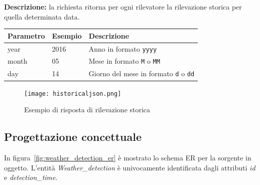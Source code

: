 \noindent\textbf{Descrizione:} la richiesta ritorna per ogni rilevatore la rilevazione storica per quella
determinata data.

\begin{table}[h]
\centering
\begin{tabular}{|l|l|l|}
\hline
\rowcolor[HTML]{3166FF} 
{\color[HTML]{FFFFFF} \textbf{Parametro}} & {\color[HTML]{FFFFFF} \textbf{Esempio}} & {\color[HTML]{FFFFFF} \textbf{Descrizione}}                           \\ \hline
year                                 & 2016                      & Anno in formato \texttt{yyyy} \\ \hline
month                                 & 05                      & Mese in formato \texttt{M} o \texttt{MM}    \\ \hline
day                                 & 14                      & Giorno del mese in formato \texttt{d} o \texttt{dd}    \\ \hline
\end{tabular}%

\end{table}


\begin{figure}[H]
\centering
\texttt{[image: historicaljson.png]}
\caption*{Esempio di risposta di rilevazione storica}
\label{fig:historicaljson}
\end{figure}

\subsection{Progettazione concettuale}

In figura~\ref{fig:weather_detection_er} è mostrato lo schema ER per la sorgente in oggetto.
L'entità \textit{Weather\_detection} è univocamente identificata dagli attributi \textit{id} e \textit{detection\_time}.

